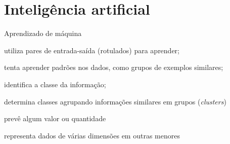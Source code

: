 \section{Inteligência artificial}

\begin{frame}{Aprendizado de máquina}
	\begin{description}
		\item[Aprendizado supervisionado] utiliza pares de entrada-saída (rotulados) para aprender;
		\item[aprendizado não-supervisionado] tenta aprender padrões nos dados, como grupos de exemplos similares;
		\item[classificação] identifica a classe da informação;
		\item[agrupamento] determina classes agrupando informações similares em grupos (\textit{clusters})
		\item[regressão] prevê algum valor ou quantidade
		\item[redução de dimensionalidade] representa dados de várias dimensões em outras menores
	\end{description}
\end{frame}

